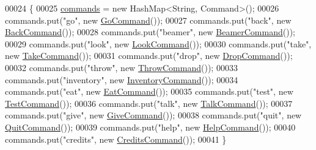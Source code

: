 \begin{DoxyCode}
00024                           \{
00025         \hyperlink{classpkg__parsing_1_1CommandWords_a82467831861a15539131a50c22e826fc}{commands} = \textcolor{keyword}{new} HashMap<String, Command>();
00026         commands.put(\textcolor{stringliteral}{"go"}, \textcolor{keyword}{new} \hyperlink{classpkg__commands_1_1GoCommand}{GoCommand}());
00027         commands.put(\textcolor{stringliteral}{"back"}, \textcolor{keyword}{new} \hyperlink{classpkg__commands_1_1BackCommand}{BackCommand}());
00028         commands.put(\textcolor{stringliteral}{"beamer"}, \textcolor{keyword}{new} \hyperlink{classpkg__commands_1_1BeamerCommand}{BeamerCommand}());
00029         commands.put(\textcolor{stringliteral}{"look"}, \textcolor{keyword}{new} \hyperlink{classpkg__commands_1_1LookCommand}{LookCommand}());
00030         commands.put(\textcolor{stringliteral}{"take"}, \textcolor{keyword}{new} \hyperlink{classpkg__commands_1_1TakeCommand}{TakeCommand}());
00031         commands.put(\textcolor{stringliteral}{"drop"}, \textcolor{keyword}{new} \hyperlink{classpkg__commands_1_1DropCommand}{DropCommand}());
00032         commands.put(\textcolor{stringliteral}{"throw"}, \textcolor{keyword}{new} \hyperlink{classpkg__commands_1_1ThrowCommand}{ThrowCommand}());
00033         commands.put(\textcolor{stringliteral}{"inventory"}, \textcolor{keyword}{new} \hyperlink{classpkg__commands_1_1InventoryCommand}{InventoryCommand}());
00034         commands.put(\textcolor{stringliteral}{"eat"}, \textcolor{keyword}{new} \hyperlink{classpkg__commands_1_1EatCommand}{EatCommand}());
00035         commands.put(\textcolor{stringliteral}{"test"}, \textcolor{keyword}{new} \hyperlink{classpkg__commands_1_1TestCommand}{TestCommand}());
00036         commands.put(\textcolor{stringliteral}{"talk"}, \textcolor{keyword}{new} \hyperlink{classpkg__commands_1_1TalkCommand}{TalkCommand}());
00037         commands.put(\textcolor{stringliteral}{"give"}, \textcolor{keyword}{new} \hyperlink{classpkg__commands_1_1GiveCommand}{GiveCommand}());
00038         commands.put(\textcolor{stringliteral}{"quit"}, \textcolor{keyword}{new} \hyperlink{classpkg__commands_1_1QuitCommand}{QuitCommand}());
00039         commands.put(\textcolor{stringliteral}{"help"}, \textcolor{keyword}{new} \hyperlink{classpkg__commands_1_1HelpCommand}{HelpCommand}());
00040         commands.put(\textcolor{stringliteral}{"credits"}, \textcolor{keyword}{new} \hyperlink{classpkg__commands_1_1CreditsCommand}{CreditsCommand}());
00041     \}
\end{DoxyCode}


